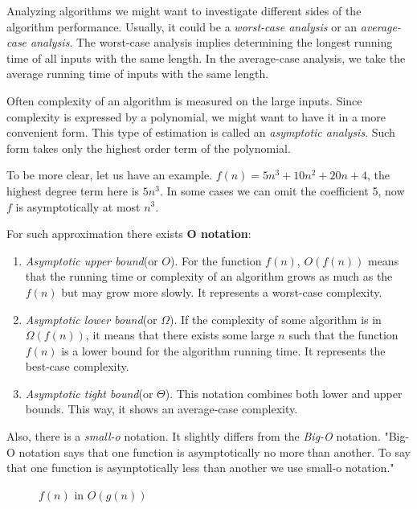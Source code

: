 \documentclass[
  field=inf,
  biblatex,
  language=english,
  glossaries,
  theorems=false,
  index
]{kidiplom}
\begin{document}
Analyzing algorithms we might want to investigate different sides of the algorithm performance. Usually, it could be a \textit{worst-case analysis} or an \textit{average-case analysis}. The worst-case analysis implies determining the longest running time of all inputs with the same length. In the average-case analysis, we take the average running time of inputs with the same length.

Often complexity of an algorithm is measured on the large inputs. Since complexity is expressed by a polynomial, we might want to have it in a more convenient form. This type of estimation is called an \textit{asymptotic analysis}. Such form takes only the highest order term of the polynomial.

To be more clear, let us have an example. $f(n) = 5n^3 + 10n^2 + 20n + 4$, the highest degree term here is $5n^3$. In some cases we can omit the coefficient 5, now $f$ is asymptotically at most $n^3$.

For such approximation there exists \textbf{O notation}:

\begin{enumerate}
	\item \textit{Asymptotic upper bound}(or $O$). For the function $f(n)$, $O(f(n))$ means that the running time or complexity of an algorithm grows as much as the $f(n)$ but may grow more slowly. It represents a worst-case complexity.
	\item \textit{Asymptotic lower bound}(or $\Omega$). If the complexity of some algorithm is in $\Omega(f(n))$, it means that there exists some large $n$ such that the function $f(n)$ is a lower bound for the algorithm running time. It represents the best-case complexity.
	\item \textit{Asymptotic tight bound}(or $\Theta$). This notation combines both lower and upper bounds. This way, it shows an average-case complexity.
\end{enumerate}

Also, there is a \textit{small-o} notation. It slightly differs from the \textit{Big-O} notation. "Big-O notation says that one function is asymptotically no more than  another. To say that one  function is asymptotically less than another we use small-o notation."\cite{sipser}

\begin{figure}[H]
	\begin{center}
		\caption{$f(n)$ in $O(g(n))$} \label{fig:big-omega}
	\end{center}
\end{figure}
\end{document}
